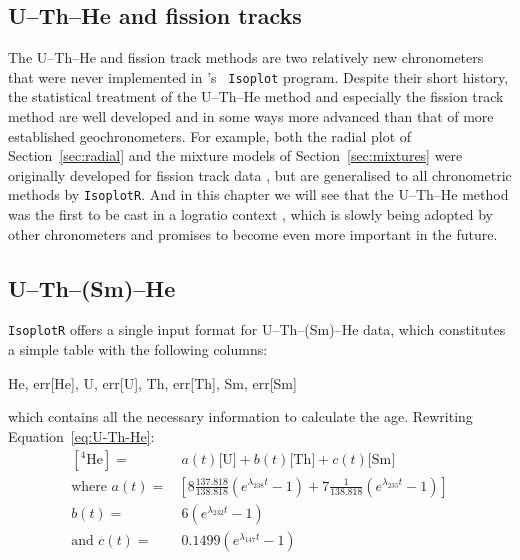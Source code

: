 \begin{refsection}

\chapter{U--Th--He and fission tracks}\label{ch:thermochron}

The U--Th--He and fission track methods are two relatively new
chronometers that were never implemented in \citet{ludwig2003}'s
~\texttt{Isoplot} program.  Despite their short history, the
statistical treatment of the U--Th--He method and especially the
fission track method are well developed and in some ways more advanced
than that of more established geochronometers. For example, both the
radial plot of Section~\ref{sec:radial} and the mixture models of
Section~\ref{sec:mixtures} were originally developed for fission track
data \citep{galbraith1990a,galbraith1990b}, but are generalised to all
chronometric methods by \texttt{IsoplotR}. And in this chapter we will
see that the U--Th--He method was the first to be cast in a logratio
context \citep{vermeesch2010a}, which is slowly being adopted by other
chronometers and promises to become even more important in the future.

\section{U--Th--(Sm)--He}\label{sec:advancedUThHe}

\texttt{IsoplotR} offers a single input format for U--Th--(Sm)--He
data, which constitutes a simple table with the following columns:

\begin{center}
He, err[He], U, err[U], Th, err[Th], Sm, err[Sm]
\end{center}

\noindent which contains all the necessary information to calculate
the age. Rewriting Equation~\ref{eq:U-Th-He}:
\begin{equation}
\begin{split}
  \left[^4\mbox{He}\right] = & ~a(t) 
   \mbox{[U]} + b(t)\mbox{[Th]} + c(t)\mbox{[Sm]} \\
   \mbox{where~} a(t) = &
   \left[8 \frac{137.818}{138.818} (e^{\lambda_{238}t} - 1) +
     7 \frac{1}{138.818} (e^{\lambda_{235}t} - 1) \right] \\
   b(t) = & ~6 (e^{\lambda_{232}t} - 1)\\
    \mbox{and~} c(t) = & ~0.1499 (e^{\lambda_{147}t} - 1)
\end{split}
\label{eq:UThHe2}
\end{equation}


\end{refsection}
